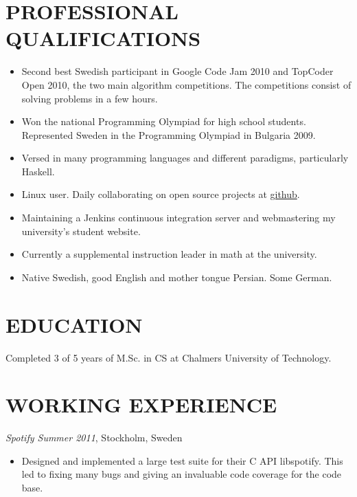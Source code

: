 \documentclass[11pt]{res} %
\begin{document}
\begin{resume}
                                               
\section{PROFESSIONAL QUALIFICATIONS} 
   \begin{itemize} %
   \item Second best Swedish participant in
    Google Code Jam 2010 and TopCoder Open 2010,
    the two main algorithm competitions.
    The competitions consist of solving problems in a few hours.
   \item Won the national Programming Olympiad for high school students.
    Represented Sweden in the Programming Olympiad in Bulgaria 2009.
   \item Versed in many programming languages and different paradigms,
    particularly Haskell.
   \item Linux user. Daily collaborating on open source projects at \hyperref[https://github.com/Tarrasch]{github}.
   \item Maintaining a Jenkins continuous integration server 
    and webmastering my university's student website.
   \item Currently a supplemental instruction leader in math at the university.
   \item Native Swedish, good English and mother tongue Persian. Some German.
 \end{itemize}
 
\section{EDUCATION} 
 \noindent Completed 3 of 5 years of M.Sc. in CS
  at Chalmers University of Technology.
 
\section{WORKING EXPERIENCE}
\emph{Spotify Summer 2011}, Stockholm, Sweden
\vspace{0.2in}
   \begin{itemize} %
   \item Designed and implemented a large test 
    suite for their C API libspotify.
    This led to fixing many bugs and giving an 
    invaluable code coverage for the code base.
 \end{itemize}



\end{resume}
\end{document}
